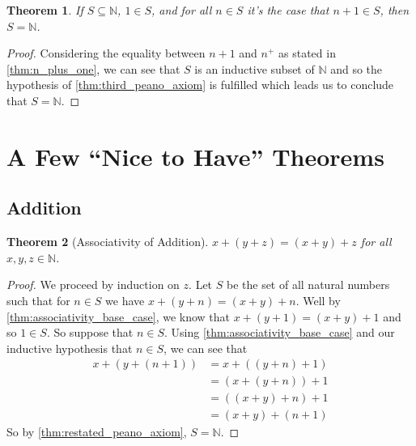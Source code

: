 \documentclass{article}
\theoremstyle{definition}
\theoremstyle{definition}
\theoremstyle{plain}
\theoremstyle{remark}
\theoremstyle{plain}
\newtheorem{theorem}{Theorem}[section]
\theoremstyle{remark}
\theoremstyle{plain}
\theoremstyle{plain}
\theoremstyle{plain}
\theoremstyle{plain}
\begin{document}
\begin{theorem}
  If \( S \subseteq \mathbb{N} \), \( 1 \in S \), and for all \( n \in S \) it's 
  the case that \( n + 1 \in S \), then \( S = \mathbb{N} \).
  \label{thm:restated_peano_axiom}
\end{theorem}

\begin{proof}
  Considering the equality between \( n + 1 \) and \( n^{+} \) as stated 
  in \autoref{thm:n_plus_one}, we can see that \( S \) is an inductive subset
  of \( \mathbb{N} \) and so the hypothesis of \autoref{thm:third_peano_axiom} 
  is fulfilled which leads us to conclude that \( S = \mathbb{N} \).
\end{proof}

\newpage

\section{A Few ``Nice to Have'' Theorems}

\subsection{Addition}

\begin{theorem}[Associativity of Addition]
 \( x + ( y + z )  = (x + y) + z \) for all \( x, y, z \in \mathbb{N} \).
 \label{thm:associativity_of_addition}
\end{theorem}

\begin{proof}
  We proceed by induction on \( z \). Let \( S \) be the set of all natural 
  numbers such that for \( n \in S \) we have \( x + (y + n) = (x + y) + n\). 
  Well by \autoref{thm:associativity_base_case}, we know that 
  \( x + (y + 1) = (x + y) + 1 \) and so \( 1 \in S \). So suppose that 
  \( n \in S \). Using \autoref{thm:associativity_base_case} and our inductive 
  hypothesis that \( n \in S \), we can see that
  \begin{align*}
    x + (y + (n + 1)) &= x + ((y + n) + 1) \\
                      &= (x + (y + n)) + 1 \\
                      &= ((x + y) + n) + 1 \\
                      &= (x + y) + (n + 1)
  \end{align*}
  So by \autoref{thm:restated_peano_axiom}, \( S = \mathbb{N} \).
\end{proof}
\end{document}
